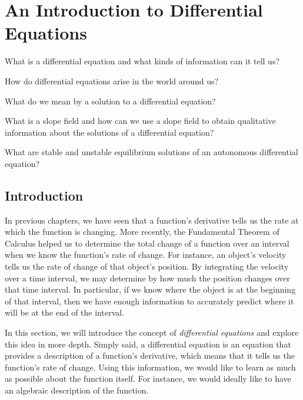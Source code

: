 \section{An Introduction to Differential Equations} \label{S:6.6.DEIntro}

\begin{goals}
\item What is a differential equation and what kinds of information can it tell us?
\item How do differential equations arise in the world around us?
\item What do we mean by a solution to a differential equation?
\item What is a slope field and how can we use a slope field to obtain qualitative information about the solutions of a differential equation?
\item What are stable and unstable equilibrium solutions of an autonomous differential equation? 
\end{goals} 

\subsection*{Introduction}

In previous chapters, we have seen that a function's derivative tells us the rate at which the function is changing.  More recently, the Fundamental Theorem of Calculus helped us to determine the total change of a function over an interval when we know the function's rate of change.  For instance, an object's velocity tells us the rate of change of that object's position.  By integrating the velocity over a time interval, we may determine by how much the position changes over that time interval.  In particular, if we know where the object is at the beginning of that interval, then we have enough information to accurately predict where it will be at the end of the interval. 

In this section, we will introduce the concept of \emph{differential equations} and explore this idea in more depth.  Simply said, a differential equation is an equation that provides a description of a function's derivative, which means that it tells us the function's rate of change.  Using this information, we would like to learn as much as possible about the function itself.  For instance, we would ideally like to have an algebraic description of the function.  

